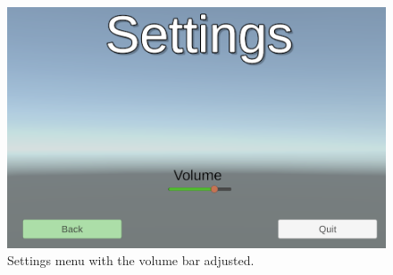 \begin{figure}[!htb]
    \centering
    \includegraphics[width=13cm]{Images/Settings.png}
       \caption{Settings menu with the volume bar adjusted.}
           \label{Fig:Vertices}
\end{figure}

\newpage

